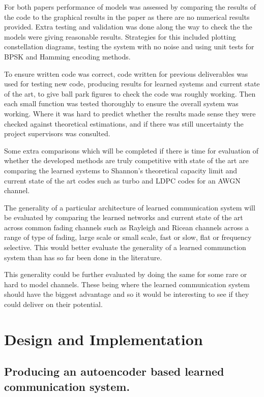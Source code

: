 \documentclass[12pt,onecolumn,letterpaper]{article}
\begin{document}
For both papers performance of models was assessed by comparing the results of the code to the graphical results in the paper as there are no numerical results provided. Extra testing and validation was done along the way to check the the models were giving reasonable results. Strategies for this included plotting constellation diagrams, testing the system with no noise and using unit tests for BPSK and Hamming encoding methods.

To ensure written code was correct, code written for previous deliverables was used for testing new code, producing results for learned systems and current state of the art, to give ball park figures to check the code was roughly working. Then each small function was tested thoroughly to ensure the overall system was working. Where it was hard to predict whether the results made sense they were checked against theoretical estimations, and if there was still uncertainty the project supervisors was consulted. 

Some extra comparisons which will be completed if there is time for evaluation of whether the developed methods are truly competitive with state of the art are comparing the learned systems to Shannon's theoretical capacity limit and current state of the art codes such as turbo and LDPC codes for an AWGN channel.

The generality of a particular architecture of learned communication system will be evaluated by comparing the learned networks and current state of the art across common fading channels such as Rayleigh and Ricean channels across a range of type of fading, large scale or small scale, fast or slow, flat or frequency selective. This would better evaluate the generality of a learned communction system than has so far been done in the literature.

This generality could be further evaluated by doing the same for some rare or hard to model channels. These being where the learned communication system should have the biggest advantage and so it would be interesting to see if they could deliver on their potential.


\FloatBarrier
\section{Design and Implementation}

\subsection{Producing an autoencoder based learned communication system.}
\end{document}
